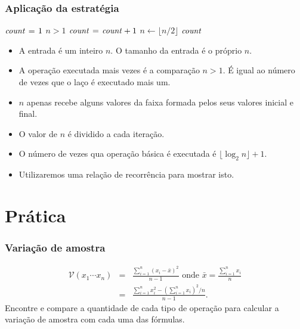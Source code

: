 \documentclass[handout]{beamer}
\begin{document}
\begin{frame}
\frametitle{Aplicação da estratégia}
\begin{footnotesize}
\begin{codebox}
\li $\id{count} \gets 1$
\li \While $n > 1$
\li \Do
\li   $\id{count} \gets \id{count}+1$
\li   $n \gets \lfloor n/2 \rfloor$
    \End    
\li \Return $\id{count}$
\end{codebox}
\end{footnotesize}
\begin{itemize}
\item A entrada é um inteiro $n$. O tamanho da entrada é o próprio $n$.
\item A operação executada mais vezes é a comparação $n > 1$. É igual
ao número de vezes que o laço é executado mais um.
\item $n$ apenas recebe alguns valores da faixa formada pelos seus valores
  inicial e final.
\item O valor de $n$ é dividido a cada iteração. 
\item O número de vezes qua operação básica é executada é $\lfloor \log_2 n \rfloor + 1$.
\item Utilizaremos uma \alert{relação de recorrência} para mostrar isto.
\end{itemize}
\end{frame}

\section{Prática}

\begin{frame}
\frametitle{Variação de amostra}

\begin{problem}
\begin{eqnarray*}
\mathcal{V}(x_1 \cdots x_n) & = & \frac{\sum_{i=1}^{n} (x_i - \bar{x})^2}{n-1}
\mbox{ onde } \bar{x} = \frac{\sum_{i=1}^{n} x_i}{n} \\
& = & \frac{\sum_{i=1}^n x_i^2 - (\sum_{i=1}^n x_i)^2/n}{n-1}.
\end{eqnarray*}
Encontre e compare a quantidade de cada tipo de operação para calcular a
variação de amostra com cada uma das fórmulas.
\end{problem}
\end{frame}
\end{document}
